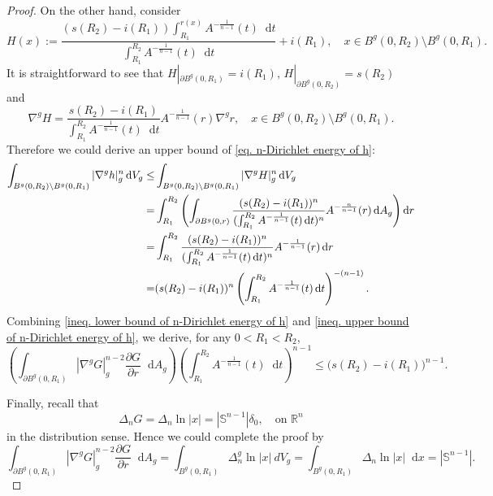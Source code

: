 \documentclass[12pt]{amsart}
\theoremstyle{plain}
\theoremstyle{definition}
\theoremstyle{remark}     %
\numberwithin{equation}{section}
\newcommand{\dd}{\mathop{}\!\mathrm{d}}%
\newcommand{\dx}{\mathop{}\!\mathrm{d}x}
\newcommand{\nablag}{\nabla^g} %
\begin{document}
\begin{proof}
    On the other hand, consider 
    \[
        H(x):=\frac{(s(R_2)-i(R_1))\int_{R_1}^{r(x)}A^{-\frac{1}{n-1}}(t)\dd t}{\int_{R_1}^{R_2} A^{-\frac{1}{n-1}}(t)\dd t}
        +i(R_1),\quad x\in B^g(0,R_2)\setminus B^g(0,R_1).
    \]
    It is straightforward to see that $H|_{\partial B^g(0,R_1)}=i(R_1),\, H|_{\partial B^g(0,R_2)}=s(R_2)$ and
    \[
        \nablag H=\frac{s(R_2)-i(R_1)}{\int_{R_1}^{R_2} A^{-\frac{1}{n-1}}(t)\dd t}
        A^{-\frac{1}{n-1}}(r)\nabla^gr,\quad x\in B^g(0,R_2)\setminus B^g(0,R_1).
    \]
    Therefore we could derive an upper bound of \cref{eq. n-Dirichlet energy of h}:
    \begin{align}
        \int_{B^g(0,R_2)\setminus B^g(0,R_1)}|\nabla^g h|_g^n\dd V_g\notag
        \leq& \int_{B^g(0,R_2)\setminus B^g(0,R_1)}|\nabla^g H|_g^n\dd V_g\notag\\
        =&\int_{R_1}^{R_2}\left(
        \int_{\partial B^g(0,r)}\frac{(s(R_2)-i(R_1))^n}{(\int_{R_1}^{R_2} A^{-\frac{1}{n-1}}(t)\dd t)^n} A^{-\frac{n}{n-1}}(r)\dd A_g
        \right)\dd r\notag\\
        =&\int_{R_1}^{R_2}
        \frac{(s(R_2)-i(R_1))^n}{(\int_{R_1}^{R_2} A^{-\frac{1}{n-1}}(t)\dd t)^n} A^{-\frac{1}{n-1}}(r)
        \dd r\notag\\
        =&(s(R_2)-i(R_1))^n
        \left(
        \int_{R_1}^{R_2} A^{-\frac{1}{n-1}}(t)\dd t
        \right)^{-(n-1)}.\label{ineq. upper bound of n-Dirichlet energy of h}
    \end{align}
    Combining  \cref{ineq. lower bound of n-Dirichlet energy of h} and \cref{ineq. upper bound of n-Dirichlet energy of h}, we derive, for any $0<R_1<R_2$,
    \[
        \left(\int_{\partial B^g(0,R_1)}|\nablag G|_g^{n-2}\frac{\partial G}{\partial r}\dd A_g\right)
        \left(
        \int_{R_1}^{R_2} A^{-\frac{1}{n-1}}(t)\dd t
        \right)^{n-1}
        \leq 
        \big(
        s(R_2)-i(R_1)
        \big)^{n-1}.
    \]

    Finally, recall that 
    \[
        \Delta_n G=\Delta_n \ln |x|=|\mathbb{S}^{n-1}|\delta_0,\quad \text{on }\mathbb{R}^n
    \]
    in the distribution sense.  Hence we could complete the proof by
    \[
        \int_{\partial B^g(0,R_1)}|\nablag G|_g^{n-2}\frac{\partial G}{\partial r}\dd A_g
        =\int_{B^g(0,R_1)}\Delta_n^g
        \ln |x| \ d V_g
        =\int_{B^g(0,R_1)}\Delta_n\ln |x| \dx
        =|\mathbb{S}^{n-1}|.
    \]
\end{proof}
\end{document}
